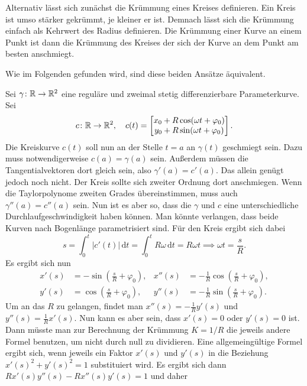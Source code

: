 Alternativ lässt sich zunächst die Krümmung eines Kreises definieren.
Ein Kreis ist umso stärker gekrümmt, je kleiner er ist. Demnach lässt
sich die Krümmung einfach als Kehrwert des Radius definieren. Die
Krümmung einer Kurve an einem Punkt ist dann die Krümmung des Kreises
der sich der Kurve an dem Punkt am besten anschmiegt.

Wie im Folgenden gefunden wird, sind diese beiden Ansätze äquivalent.

Sei $\gamma\colon\mathbb R\to\mathbb R^2$ eine reguläre und zweimal stetig
differenzierbare Parameterkurve. Sei
\begin{equation}
c\colon\mathbb R\to\mathbb R^2,\quad c(t)=\begin{bmatrix}
x_0+R\cos(\omega t+\varphi_0)\\
y_0+R\sin(\omega t+\varphi_0)
\end{bmatrix}.
\end{equation}
Die Kreiskurve $c(t)$ soll nun an der Stelle $t=a$ an $\gamma(t)$
geschmiegt sein. Dazu muss notwendigerweise $c(a)=\gamma(a)$ sein.
Außerdem müssen die Tangentialvektoren dort gleich sein, also
$\gamma'(a) = c'(a)$. Das allein genügt jedoch noch nicht. Der
Kreis sollte sich zweiter Ordnung dort anschmiegen. Wenn die
Taylorpolynome zweiten Grades übereinstimmen, muss auch
$\gamma''(a) = c''(a)$ sein. Nun ist es aber so, dass die $\gamma$
und $c$ eine unterschiedliche Durchlaufgeschwindigkeit haben können.
Man könnte verlangen, dass beide Kurven nach Bogenlänge parametrisiert
sind. Für den Kreis ergibt sich dabei
\begin{equation}
s = \int_0^t |c'(t)|\,\mathrm dt = \int_0^t R\omega\,\mathrm dt
= R\omega t \implies \omega t = \frac{s}{R}.
\end{equation}
Es ergibt sich nun
\begin{align}
x'(s) &= -\sin(\tfrac{s}{R}+\varphi_0),
& x''(s) &= -\tfrac{1}{R}\cos(\tfrac{s}{R}+\varphi_0),\\
y'(s) &= \cos(\tfrac{s}{R}+\varphi_0),
& y''(s) &= -\tfrac{1}{R}\sin(\tfrac{s}{R}+\varphi_0).
\end{align}
Um an das $R$ zu gelangen, findet man $x''(s)=-\tfrac{1}{R}y'(s)$
und $y''(s)=\tfrac{1}{R}x'(s)$. Nun kann es aber sein, dass
$x'(s)=0$ oder $y'(s)=0$ ist. Dann müsste man zur Berechnung der
Krümmung $K = 1/R$ die jeweils andere Formel benutzen, um
nicht durch null zu dividieren. Eine allgemeingültige Formel
ergibt sich, wenn jeweils ein Faktor $x'(s)$ und $y'(s)$ in
die Beziehung $x'(s)^2+y'(s)^2=1$ substituiert wird. Es ergibt
sich dann $Rx'(s)y''(s)-Rx''(s)y'(s)=1$ und daher
